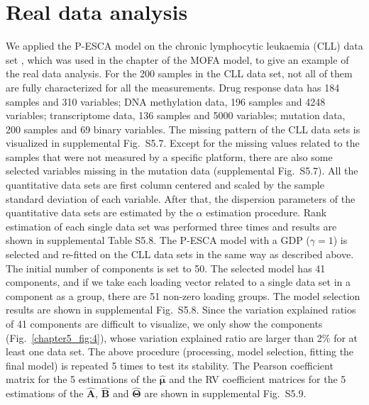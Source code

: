 \section{Real data analysis}
We applied the P-ESCA model on the chronic lymphocytic leukaemia (CLL) data set \cite{dietrich2018drug,argelaguet2018multi}, which was used in the chapter of the MOFA model, to give an example of the real data analysis. For the 200 samples in the CLL data set, not all of them are fully characterized for all the measurements. Drug response data has 184 samples and 310 variables; DNA methylation data, 196 samples and 4248 variables; transcriptome data, 136 samples and 5000 variables; mutation data, 200 samples and 69 binary variables. The missing pattern of the CLL data sets is visualized in supplemental Fig.~S5.7. Except for the missing values related to the samples that were not measured by a specific platform, there are also some selected variables missing in the mutation data (supplemental Fig.~S5.7). All the quantitative data sets are first column centered and scaled by the sample standard deviation of each variable. After that, the dispersion parameters of the quantitative data sets are estimated by the $\alpha$ estimation procedure. Rank estimation of each single data set was performed three times and results are shown in supplemental Table S5.8. The P-ESCA model with a GDP ($\gamma=1$) is selected and re-fitted on the CLL data sets in the same way as described above. The initial number of components is set to 50. The selected model has 41 components, and if we take each loading vector related to a single data set in a component as a group, there are 51 non-zero loading groups. The model selection results are shown in supplemental Fig.~S5.8. Since the variation explained ratios of 41 components are difficult to visualize, we only show the components (Fig.~\ref{chapter5_fig:4}), whose variation explained ratio are larger than 2\% for at least one data set. The above procedure (processing, model selection, fitting the final model) is repeated 5 times to test its stability. The Pearson coefficient matrix for the 5 estimations of the $\hat{\bm{\mu}}$ and the RV coefficient matrices for the 5 estimations of the $\hat{\mathbf{A}}$, $\hat{\mathbf{B}}$ and $\hat{\mathbf{\Theta}}$ are shown in supplemental Fig.~S5.9.

